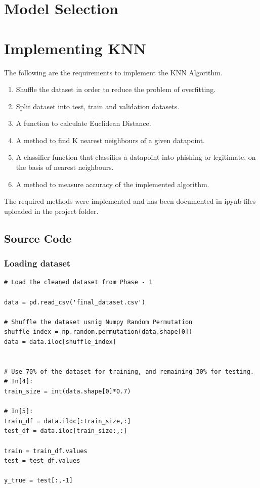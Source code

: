 \documentclass[letterpaper, 28pt, fleqn]{article}
\begin{document}
\begin{multicols}{2}
\begin{itemize}
\end{itemize}

\section{Model Selection}



\section{Implementing KNN}

The following are the requirements to implement the KNN Algorithm. 

\begin{enumerate}
\item Shuffle the dataset in order to reduce the problem of overfitting.
\item Split dataset into test, train and validation datasets.
\item A function to calculate Euclidean Distance.
\item A method to find K nearest neighbours of a given datapoint.
\item A classifier function that classifies a datapoint into phishing or legitimate, on the basis of nearest neighbours.
\item A method to measure accuracy of the implemented algorithm.
\end{enumerate}

The required methods were implemented and has been documented in ipynb files uploaded in the project folder.
\end{multicols}

\subsection{Source Code}

\subsubsection{Loading dataset}

\begin{lstlisting}
# Load the cleaned dataset from Phase - 1

data = pd.read_csv('final_dataset.csv')

# Shuffle the dataset usnig Numpy Random Permutation
shuffle_index = np.random.permutation(data.shape[0])
data = data.iloc[shuffle_index]


# Use 70% of the dataset for training, and remaining 30% for testing.
# In[4]:
train_size = int(data.shape[0]*0.7)

# In[5]:
train_df = data.iloc[:train_size,:] 
test_df = data.iloc[train_size:,:]

train = train_df.values
test = test_df.values

y_true = test[:,-1]

\end{lstlisting}
\end{document}

